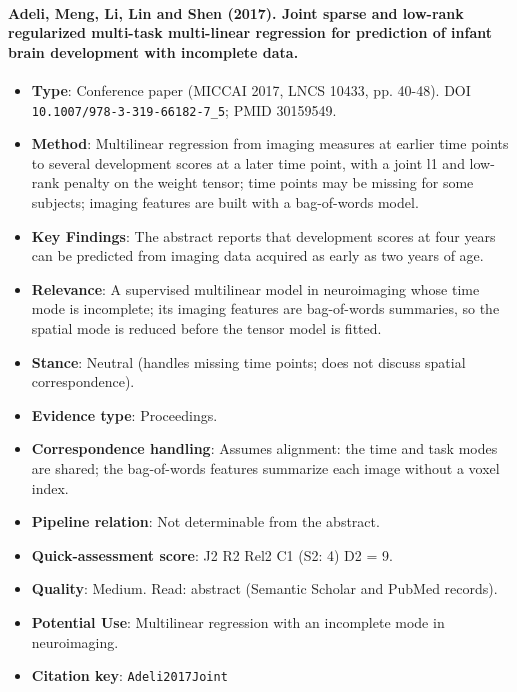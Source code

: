 \documentclass[journal,onecolumn]{IEEEtran}
\begin{document}
\paragraph{Adeli, Meng, Li, Lin and Shen (2017). Joint sparse and low-rank regularized multi-task multi-linear regression for prediction of infant brain development with incomplete data.~\cite{Adeli2017Joint}}\mbox{}

\begin{itemize}

\item{} \textbf{Type}: Conference paper (MICCAI 2017, LNCS 10433, pp. 40-48). DOI \nolinkurl{10.1007/978-3-319-66182-7_5}; PMID 30159549.

\item{} \textbf{Method}: Multilinear regression from imaging measures at earlier time points to several development scores at a later time point, with a joint l1 and low-rank penalty on the weight tensor; time points may be missing for some subjects; imaging features are built with a bag-of-words model.

\item{} \textbf{Key Findings}: The abstract reports that development scores at four years can be predicted from imaging data acquired as early as two years of age.

\item{} \textbf{Relevance}: A supervised multilinear model in neuroimaging whose time mode is incomplete; its imaging features are bag-of-words summaries, so the spatial mode is reduced before the tensor model is fitted.

\item{} \textbf{Stance}: Neutral (handles missing time points; does not discuss spatial correspondence).

\item{} \textbf{Evidence type}: Proceedings.

\item{} \textbf{Correspondence handling}: Assumes alignment: the time and task modes are shared; the bag-of-words features summarize each image without a voxel index.

\item{} \textbf{Pipeline relation}: Not determinable from the abstract.

\item{} \textbf{Quick-assessment score}: J2 R2 Rel2 C1 (S2: 4) D2 = 9.

\item{} \textbf{Quality}: Medium. Read: abstract (Semantic Scholar and PubMed records).

\item{} \textbf{Potential Use}: Multilinear regression with an incomplete mode in neuroimaging.

\item{} \textbf{Citation key}: \texttt{Adeli2017Joint}

\end{itemize}
\end{document}
